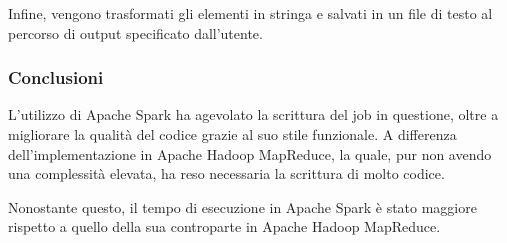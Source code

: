 \documentclass[10pt]{article}
\begin{document}
Infine, vengono trasformati gli elementi in stringa e salvati in un file di testo al percorso di output specificato dall'utente.

\subsubsection{Conclusioni}

L'utilizzo di Apache Spark ha agevolato la scrittura del job in questione, oltre a migliorare la qualità del codice grazie al suo stile funzionale. A differenza dell'implementazione in Apache Hadoop MapReduce, la quale, pur non avendo una complessità elevata, ha reso necessaria la scrittura di molto codice.

Nonostante questo, il tempo di esecuzione in Apache Spark è stato maggiore rispetto a quello della sua controparte in Apache Hadoop MapReduce.

\begin{comment}

Please provide:
\begin{itemize}
\item Description of the implementation. A schematic and concise discussion is preferrable to a verbose narrative. Focus on how the data is manipulated in the job (e.g., what do keys and values represent across the different stages, what operations are carried out). 
\item Performance considerations with respect the (potentially) carried out optimizations, e.g., in terms of:
\begin{itemize}
\item allocated resources and tasks;
\item enforced partitioning;
\item data caching;
\item combiner usage;
\item broadcast variables usage;
\item any other kind of optimization.
\end{itemize}
\item Short extract of the output and discussion (i.e., whether there is any relevant insight obtained).
\end{itemize}

\end{comment}
\end{document}
